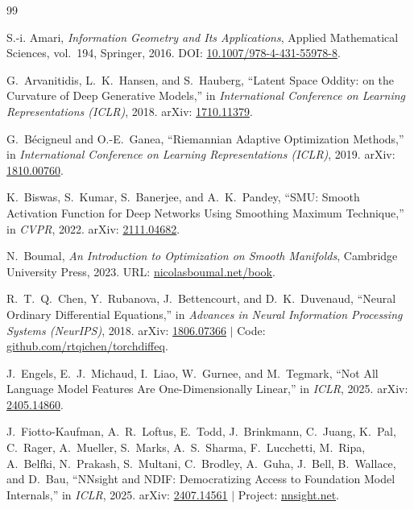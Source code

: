 \documentclass[11pt,a4paper]{article}
\theoremstyle{definition}
\begin{document}
\begin{thebibliography}{99}

S.-i. Amari,
\emph{Information Geometry and Its Applications},
Applied Mathematical Sciences, vol.~194, Springer, 2016.
DOI: \href{https://doi.org/10.1007/978-4-431-55978-8}{10.1007/978-4-431-55978-8}.

G.~Arvanitidis, L.~K.~Hansen, and S.~Hauberg,
``Latent Space Oddity: on the Curvature of Deep Generative Models,''
in \emph{International Conference on Learning Representations (ICLR)}, 2018.
arXiv: \href{https://arxiv.org/abs/1710.11379}{1710.11379}.

G.~B\'ecigneul and O.-E.~Ganea,
``Riemannian Adaptive Optimization Methods,''
in \emph{International Conference on Learning Representations (ICLR)}, 2019.
arXiv: \href{https://arxiv.org/abs/1810.00760}{1810.00760}.

K.~Biswas, S.~Kumar, S.~Banerjee, and A.~K.~Pandey,
``SMU: Smooth Activation Function for Deep Networks Using Smoothing Maximum Technique,''
in \emph{CVPR}, 2022.
arXiv: \href{https://arxiv.org/abs/2111.04682}{2111.04682}.

N.~Boumal,
\emph{An Introduction to Optimization on Smooth Manifolds},
Cambridge University Press, 2023.
URL: \href{https://www.nicolasboumal.net/book/}{nicolasboumal.net/book}.

R.~T.~Q.~Chen, Y.~Rubanova, J.~Bettencourt, and D.~K.~Duvenaud,
``Neural Ordinary Differential Equations,''
in \emph{Advances in Neural Information Processing Systems (NeurIPS)}, 2018.
arXiv: \href{https://arxiv.org/abs/1806.07366}{1806.07366} $\mid$
Code: \href{https://github.com/rtqichen/torchdiffeq}{github.com/rtqichen/torchdiffeq}.

J.~Engels, E.~J.~Michaud, I.~Liao, W.~Gurnee, and M.~Tegmark,
``Not All Language Model Features Are One-Dimensionally Linear,''
in \emph{ICLR}, 2025.
arXiv: \href{https://arxiv.org/abs/2405.14860}{2405.14860}.

J.~Fiotto-Kaufman, A.~R.~Loftus, E.~Todd, J.~Brinkmann, C.~Juang, K.~Pal, C.~Rager, A.~Mueller, S.~Marks, A.~S.~Sharma, F.~Lucchetti, M.~Ripa, A.~Belfki, N.~Prakash, S.~Multani, C.~Brodley, A.~Guha, J.~Bell, B.~Wallace, and D.~Bau,
``NNsight and NDIF: Democratizing Access to Foundation Model Internals,''
in \emph{ICLR}, 2025.
arXiv: \href{https://arxiv.org/abs/2407.14561}{2407.14561} $\mid$
Project: \href{https://nnsight.net}{nnsight.net}.


\end{thebibliography}
\end{document}
